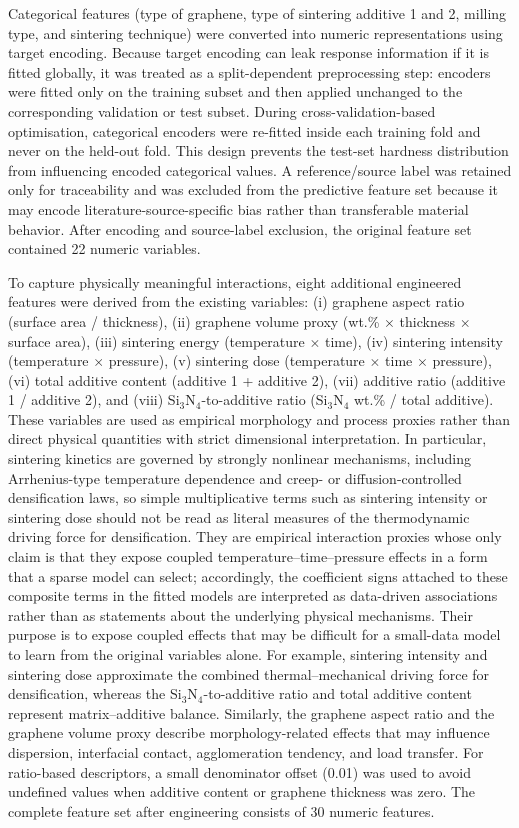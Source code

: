 \documentclass[pdflatex,sn-mathphys-num]{sn-jnl}%
\theoremstyle{thmstyleone}%
\theoremstyle{thmstyletwo}%
\theoremstyle{thmstylethree}%
\begin{document}
Categorical features (type of graphene, type of sintering additive 1 and 2, milling type, and sintering technique) were converted into numeric representations using target encoding. Because target encoding can leak response information if it is fitted globally, it was treated as a split-dependent preprocessing step: encoders were fitted only on the training subset and then applied unchanged to the corresponding validation or test subset. During cross-validation-based optimisation, categorical encoders were re-fitted inside each training fold and never on the held-out fold. This design prevents the test-set hardness distribution from influencing encoded categorical values. A reference/source label was retained only for traceability and was excluded from the predictive feature set because it may encode literature-source-specific bias rather than transferable material behavior. After encoding and source-label exclusion, the original feature set contained 22 numeric variables.

To capture physically meaningful interactions, eight additional engineered features were derived from the existing variables: (i) graphene aspect ratio (surface area / thickness), (ii) graphene volume proxy (wt.\% $\times$ thickness $\times$ surface area), (iii) sintering energy (temperature $\times$ time), (iv) sintering intensity (temperature $\times$ pressure), (v) sintering dose (temperature $\times$ time $\times$ pressure), (vi) total additive content (additive 1 + additive 2), (vii) additive ratio (additive 1 / additive 2), and (viii) Si$_3$N$_4$-to-additive ratio (Si$_3$N$_4$ wt.\% / total additive). These variables are used as empirical morphology and process proxies rather than direct physical quantities with strict dimensional interpretation. In particular, sintering kinetics are governed by strongly nonlinear mechanisms, including Arrhenius-type temperature dependence and creep- or diffusion-controlled densification laws, so simple multiplicative terms such as sintering intensity or sintering dose should not be read as literal measures of the thermodynamic driving force for densification. They are empirical interaction proxies whose only claim is that they expose coupled temperature--time--pressure effects in a form that a sparse model can select; accordingly, the coefficient signs attached to these composite terms in the fitted models are interpreted as data-driven associations rather than as statements about the underlying physical mechanisms. Their purpose is to expose coupled effects that may be difficult for a small-data model to learn from the original variables alone. For example, sintering intensity and sintering dose approximate the combined thermal--mechanical driving force for densification, whereas the Si$_3$N$_4$-to-additive ratio and total additive content represent matrix--additive balance. Similarly, the graphene aspect ratio and the graphene volume proxy describe morphology-related effects that may influence dispersion, interfacial contact, agglomeration tendency, and load transfer. For ratio-based descriptors, a small denominator offset (0.01) was used to avoid undefined values when additive content or graphene thickness was zero. The complete feature set after engineering consists of 30 numeric features.
\end{document}
